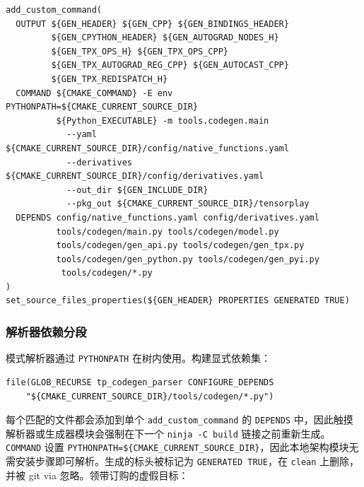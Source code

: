 \begin{lstlisting}[caption={generation rule (abridged).}, label=lst:cmake, style=cppstyle]
add_custom_command(
  OUTPUT ${GEN_HEADER} ${GEN_CPP} ${GEN_BINDINGS_HEADER}
         ${GEN_CPYTHON_HEADER} ${GEN_AUTOGRAD_NODES_H}
         ${GEN_TPX_OPS_H} ${GEN_TPX_OPS_CPP}
         ${GEN_TPX_AUTOGRAD_REG_CPP} ${GEN_AUTOCAST_CPP}
         ${GEN_TPX_REDISPATCH_H}
  COMMAND ${CMAKE_COMMAND} -E env PYTHONPATH=${CMAKE_CURRENT_SOURCE_DIR}
          ${Python_EXECUTABLE} -m tools.codegen.main
            --yaml ${CMAKE_CURRENT_SOURCE_DIR}/config/native_functions.yaml
            --derivatives ${CMAKE_CURRENT_SOURCE_DIR}/config/derivatives.yaml
            --out_dir ${GEN_INCLUDE_DIR}
            --pkg_out ${CMAKE_CURRENT_SOURCE_DIR}/tensorplay
  DEPENDS config/native_functions.yaml config/derivatives.yaml
          tools/codegen/main.py tools/codegen/model.py
          tools/codegen/gen_api.py tools/codegen/gen_tpx.py
          tools/codegen/gen_python.py tools/codegen/gen_pyi.py
           tools/codegen/*.py
)
set_source_files_properties(${GEN_HEADER} PROPERTIES GENERATED TRUE)
\end{lstlisting}

\subsubsection{解析器依赖分段}

模式解析器通过 \texttt{PYTHONPATH} 在树内使用。构建显式依赖集：

\begin{lstlisting}[caption={parser collection.}, label=lst:cmakeparser, style=cppstyle]
file(GLOB_RECURSE tp_codegen_parser CONFIGURE_DEPENDS
    "${CMAKE_CURRENT_SOURCE_DIR}/tools/codegen/*.py")
\end{lstlisting}

每个匹配的文件都会添加到单个 \texttt{add\_custom\_command} 的 \texttt{DEPENDS} 中，因此触摸解析器或生成器模块会强制在下一个 \texttt{ninja -C build} 链接之前重新生成。 \texttt{COMMAND} 设置 \texttt{PYTHONPATH=\$\{CMAKE\_CURRENT\_SOURCE\_DIR\}}，因此本地架构模块无需安装步骤即可解析。生成的标头被标记为 \texttt{GENERATED TRUE}，在 \texttt{clean} 上删除，并被 git via 忽略。领带订购的虚假目标：

